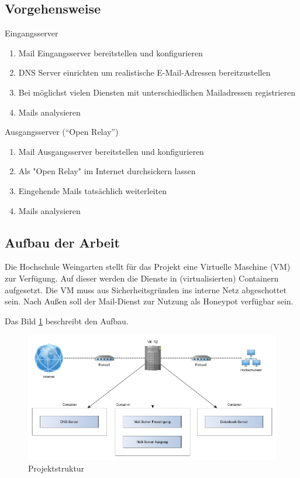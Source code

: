 \documentclass[a4paper,11pt,singlespacing]{article}
\begin{document}
	\subsection{Vorgehensweise}\label{sec:EinleitungVorgehensweise}
		Eingangsserver
		\begin{enumerate}
		\item Mail Eingangsserver bereitstellen und konfigurieren
		\item DNS Server einrichten um realistische E-Mail-Adressen bereitzustellen
		\item Bei möglichst vielen Diensten mit unterschiedlichen Mailadressen registrieren
		\item Mails analysieren
		\end{enumerate}

		Ausgangsserver ("`Open Relay"') %
		\begin{enumerate}
		\item Mail Ausgangsserver bereitstellen und konfigurieren
		\item Als "Open Relay" im Internet durchsickern lassen %
		\item Eingehende Mails tatsächlich weiterleiten
		\item Mails analysieren
		\end{enumerate}

	\subsection{Aufbau der Arbeit}\label{sec:EinleitungAufbau}
		Die Hochschule Weingarten stellt für das Projekt eine Virtuelle Maschine (VM) zur Verfügung. %
		Auf dieser werden die Dienste in (virtualisierten) Containern aufgesetzt. %
		Die VM muss aus Sicherheitsgründen ins interne Netz abgeschottet sein.
		Nach Außen soll der Mail-Dienst zur Nutzung als Honeypot verfügbar sein.

		Das Bild \ref{fig:structure} beschreibt den Aufbau.

		\begin{figure}
		\includegraphics[width=\linewidth]{2-Hierarchy.png}
		\caption{Projektstruktur}
		\label{fig:structure}
		\end{figure}
\end{document}
